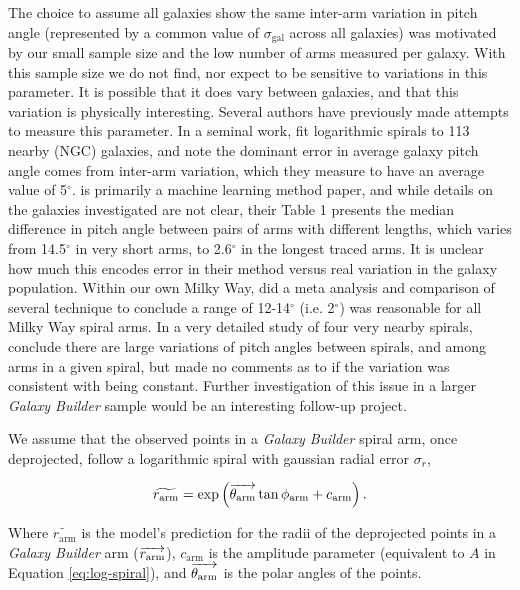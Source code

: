 The choice to assume all galaxies show the same inter-arm variation in pitch angle (represented by a common value of $\sigma_\mathrm{gal}$ across all galaxies) was motivated by our small sample size and the low number of arms measured per galaxy. With this sample size we do not find, nor expect to be sensitive to variations in this parameter. It is possible that it does vary between galaxies, and that this variation is physically interesting. Several authors have previously made attempts to measure this parameter.  In a seminal work, \citet{1981AJ.....86.1847K} fit logarithmic spirals to 113 nearby (NGC) galaxies, and note the dominant error in average galaxy pitch angle comes from inter-arm variation, which they measure to have an average value of 5$^\circ$. \citet{2014ApJ...790...87D} is primarily a machine learning method paper, and while details on the galaxies investigated are not clear, their Table 1 presents the median difference in pitch angle between pairs of arms with different lengths, which varies from 14.5$^\circ$ in very short arms, to 2.6$^\circ$ in the longest traced arms. It is unclear how much this encodes error in their method versus real variation in the galaxy population. Within our own Milky Way, \citet{Vallee2015} did a meta analysis and comparison of several technique to conclude a range of 12-14$^\circ$ (i.e. 2$^\circ$) was reasonable for all Milky Way spiral arms. In a very detailed study of four very nearby spirals, \citet{HonigRead2015} conclude there are large variations of pitch angles  between spirals, and among arms in a given spiral, but made no comments as to if the variation was consistent with being constant. Further investigation of this issue in a larger \textit{Galaxy Builder} sample would be an interesting follow-up project.

We assume that the observed points in a \textit{Galaxy Builder} spiral arm, once deprojected, follow a logarithmic spiral with gaussian radial error $\sigma_r$,

\begin{equation}
\widetilde{r_\mathrm{arm}} = \exp\left(\overrightarrow{\theta_\mathrm{arm}}\tan\phi_\mathrm{arm} + c_\mathrm{arm}\right).
\end{equation}

Where $\widetilde{r_\mathrm{arm}}$ is the model's prediction for the radii of the deprojected points in a \textit{Galaxy Builder} arm ($\overrightarrow{r_\mathrm{arm}}$), $c_\mathrm{arm}$ is the amplitude parameter (equivalent to $A$ in Equation \ref{eq:log-spiral}), and $\overrightarrow{\theta_\mathrm{arm}}$ is the polar angles of the points.

